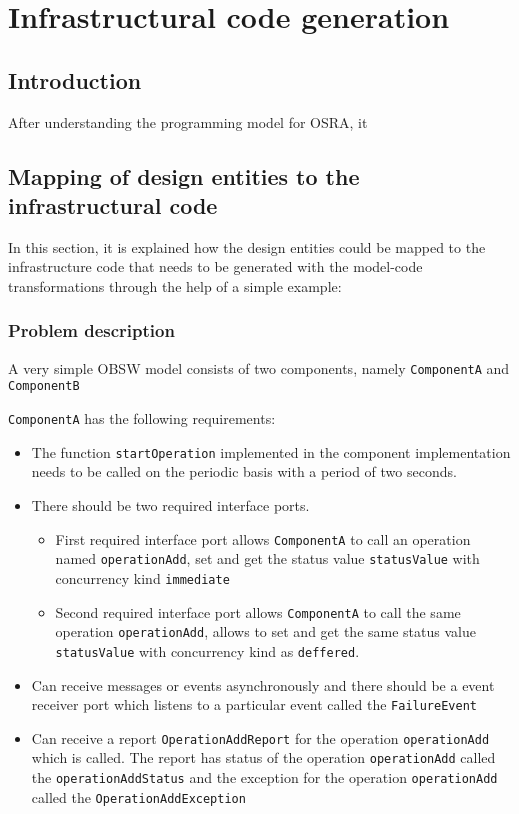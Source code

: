 
\chapter{Infrastructural code generation}
\label{chap: Code generation}
\section{Introduction}
After understanding the programming model for OSRA, it 

\section{Mapping of design entities to the infrastructural code}    
In this section, it is explained how the design entities could be mapped to the infrastructure code that needs to be generated with the model-code transformations through the help of a simple example:

\subsection{Problem description}
A very simple OBSW model consists of two components, namely \texttt{ComponentA} and \texttt{ComponentB} 

\texttt{ComponentA} has the following requirements:
\begin{itemize}
\item The function \texttt{startOperation} implemented in the component implementation needs to be called on the periodic basis with a period of two seconds.

\item There should be two required interface ports. 
\begin{itemize}
\item First required interface port allows \texttt{ComponentA} to call an operation named \texttt{operationAdd}, set and get the status value \texttt{statusValue} with concurrency kind \texttt{immediate}
\item Second required interface port allows \texttt{ComponentA} to call the same operation \texttt{operationAdd}, allows to set and get the same status value \texttt{statusValue} with concurrency kind as \texttt{deffered}. 
\end{itemize}

\item Can receive messages or events asynchronously and there should be a event receiver port which listens to a particular event called the \texttt{FailureEvent} 

\item Can receive a report \texttt{OperationAddReport} for the operation \texttt{operationAdd} which is called. The report has status of the operation \texttt{operationAdd} called the \texttt{operationAddStatus} and the exception for the operation \texttt{operationAdd} called the \texttt{OperationAddException} 
\end{itemize}

